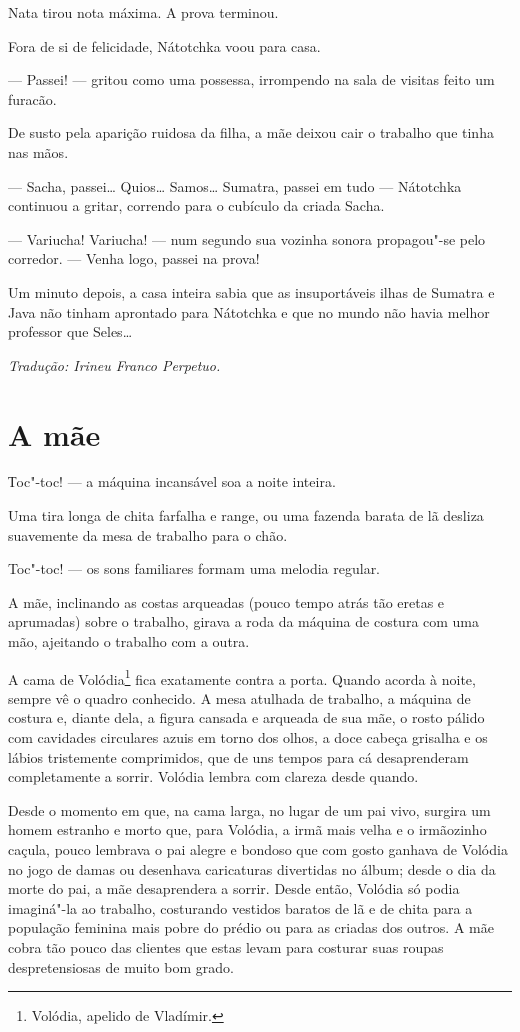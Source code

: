 Nata tirou nota máxima. A prova terminou.

Fora de si de felicidade, Nátotchka voou para casa.

--- Passei! --- gritou como uma possessa, irrompendo na sala de visitas
feito um furacão.

De susto pela aparição ruidosa da filha, a mãe deixou cair o trabalho
que tinha nas mãos.

--- Sacha, passei\ldots{} Quios\ldots{} Samos\ldots{} Sumatra, passei em tudo ---
Nátotchka continuou a gritar, correndo para o cubículo da criada Sacha.

--- Variucha! Variucha! --- num segundo sua vozinha sonora propagou"-se
pelo corredor. --- Venha logo, passei na prova!

Um minuto depois, a casa inteira sabia que as insuportáveis ilhas de
Sumatra e Java não tinham aprontado para Nátotchka e que no mundo não
havia melhor professor que Seles\ldots{}

\medskip

{\footnotesize\hfill\emph{Tradução: Irineu Franco Perpetuo.}}

\chapter{A mãe}\label{part13}

Тoc"-toc! --- a máquina incansável soa a noite inteira.

Uma tira longa de chita farfalha e range, ou uma fazenda barata de lã
desliza suavemente da mesa de trabalho para o chão.

Toc"-toc! --- os sons familiares formam uma melodia regular.

A mãe, inclinando as costas arqueadas (pouco tempo atrás tão eretas e
aprumadas) sobre o trabalho, girava a roda da máquina de costura com uma
mão, ajeitando o trabalho com a outra.

A cama de Volódia\footnote{Volódia, apelido de Vladímir.} fica
exatamente contra a porta. Quando acorda à noite, sempre vê o quadro
conhecido. A mesa atulhada de trabalho, a máquina de costura e, diante
dela, a figura cansada e arqueada de sua mãe, o rosto pálido com
cavidades circulares azuis em torno dos olhos, a doce cabeça grisalha e
os lábios tristemente comprimidos, que de uns tempos para cá
desaprenderam completamente a sorrir. Volódia lembra com clareza desde
quando.

Desde o momento em que, na cama larga, no lugar de um pai vivo, surgira
um homem estranho e morto que, para Volódia, a irmã mais velha e o
irmãozinho caçula, pouco lembrava o pai alegre e bondoso que com gosto
ganhava de Volódia no jogo de damas ou desenhava caricaturas divertidas
no álbum; desde o dia da morte do pai, a mãe desaprendera a sorrir.
Desde então, Volódia só podia imaginá"-la ao trabalho, costurando
vestidos baratos de lã e de chita para a população feminina mais pobre
do prédio ou para as criadas dos outros. A mãe cobra tão pouco das
clientes que estas levam para costurar suas roupas despretensiosas de
muito bom grado.

